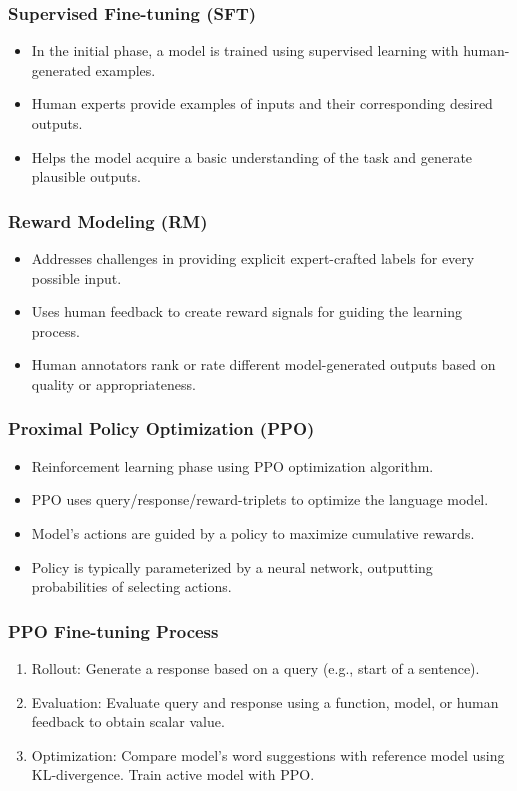 \begin{frame}[fragile]\frametitle{Supervised Fine-tuning (SFT)}
\begin{itemize}
    \item In the initial phase, a model is trained using supervised learning with human-generated examples.
    \item Human experts provide examples of inputs and their corresponding desired outputs.
    \item Helps the model acquire a basic understanding of the task and generate plausible outputs.
\end{itemize}
\end{frame}

\begin{frame}[fragile]\frametitle{Reward Modeling (RM)}
\begin{itemize}
    \item Addresses challenges in providing explicit expert-crafted labels for every possible input.
    \item Uses human feedback to create reward signals for guiding the learning process.
    \item Human annotators rank or rate different model-generated outputs based on quality or appropriateness.
\end{itemize}
\end{frame}

\begin{frame}[fragile]\frametitle{Proximal Policy Optimization (PPO)}
\begin{itemize}
    \item Reinforcement learning phase using PPO optimization algorithm.
    \item PPO uses query/response/reward-triplets to optimize the language model.
    \item Model's actions are guided by a policy to maximize cumulative rewards.
    \item Policy is typically parameterized by a neural network, outputting probabilities of selecting actions.
\end{itemize}
\end{frame}

\begin{frame}[fragile]\frametitle{PPO Fine-tuning Process}
\begin{enumerate}
    \item Rollout: Generate a response based on a query (e.g., start of a sentence).
    \item Evaluation: Evaluate query and response using a function, model, or human feedback to obtain scalar value.
    \item Optimization: Compare model's word suggestions with reference model using KL-divergence. Train active model with PPO.
\end{enumerate}
\end{frame}

